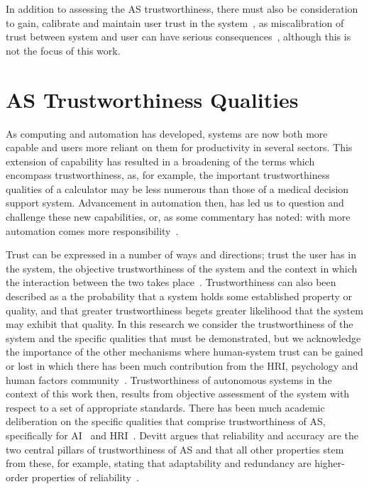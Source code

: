 In addition to assessing the AS trustworthiness, there must also be consideration to gain, calibrate and maintain user trust in the system~\cite{kok2020trust, Chiou2021}, as miscalibration of trust between system and user can have serious consequences~\cite{kok2020trust}, although this is not the focus of this work. 





\section{AS Trustworthiness Qualities}\label{sec:astq}

As computing and automation has developed, systems are now both more capable and users more reliant on them for productivity in several sectors. This extension of capability has resulted in a broadening of the terms which encompass trustworthiness, as, for example, the important trustworthiness qualities of a calculator may be less numerous than those of a medical decision support system. Advancement in automation then, has led us to question and challenge these new capabilities, or, as some commentary has noted: with more automation comes more responsibility~\cite{Yazdanpanah2021}. 

Trust can be expressed in a number of ways and directions; trust the user has in the system, the objective trustworthiness of the system and the context in which the interaction between the two takes place~\cite{Hancock2021}. 
%
Trustworthiness can also been described as a the probability that a system holds some established property or quality, and that greater trustworthiness begets greater likelihood that the system may exhibit that quality. 
%
In this research we consider the trustworthiness of the system and the specific qualities that must be demonstrated, but we acknowledge the importance of the other mechanisms where human-system trust can be gained or lost in which there has been much contribution from the HRI, psychology and human factors community~\cite{Floridi2019,Lee2004,kok2020trust,Chiou2021,Kohn2021,kraus2022trustworthy}. 
%
Trustworthiness of autonomous systems in the context of this work then, results from objective assessment of the system with respect to a set of appropriate standards. 
%
There has been much academic deliberation on the specific qualities that comprise trustworthiness of AS, specifically for AI~\cite{Thiebes2021,Wing2021} and HRI~\cite{kraus2022trustworthy,atkinson2012trust}. 
%
Devitt argues that reliability and accuracy are the two central pillars of trustworthiness of AS and that all other properties stem from these, for example, stating that adaptability and redundancy are higher-order properties of reliability~\cite{devitt2018trustworthiness}. 

